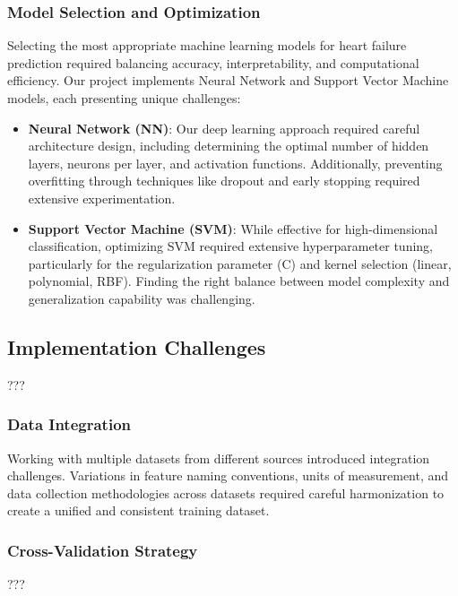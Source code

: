 \documentclass[11pt,a4paper]{article}
\newcommand{\greencheck}{\textcolor{green}{\ding{52}}}
\begin{document}
\subsubsection{Model Selection and Optimization}
\vspace{-0.25cm}
Selecting the most appropriate machine learning models for heart failure prediction required balancing accuracy, interpretability, and computational efficiency. Our project implements Neural Network and Support Vector Machine models, each presenting unique challenges:

\begin{itemize}
    \vspace{-0.25cm}
    \item \textbf{\greencheck \space Neural Network (NN)}: Our deep learning approach required careful architecture design, including determining the optimal number of hidden layers, neurons per layer, and activation functions. Additionally, preventing overfitting through techniques like dropout and early stopping required extensive experimentation.

    \item \textbf{\greencheck \space Support Vector Machine (SVM)}: While effective for high-dimensional classification, optimizing SVM required extensive hyperparameter tuning, particularly for the regularization parameter (C) and kernel selection (linear, polynomial, RBF). Finding the right balance between model complexity and generalization capability was challenging.
\end{itemize}

\subsection{Implementation Challenges}

???


\subsubsection{Data Integration}
\vspace{-0.25cm}
Working with multiple datasets from different sources
introduced integration challenges.
Variations in feature naming conventions, units of measurement,
and data collection methodologies across datasets required
careful harmonization to create a unified and consistent training dataset.

\subsubsection{Cross-Validation Strategy}
\vspace{-0.25cm}
???
\end{document}
